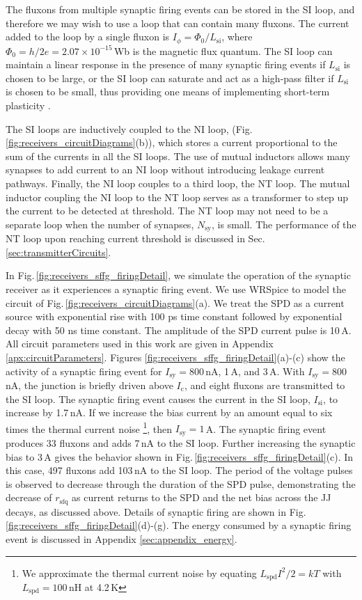 \documentclass[twocolumn]{article}
\begin{document}
The fluxons from multiple synaptic firing events can be stored in the SI loop, and therefore we may wish to use a loop that can contain many fluxons. The current added to the loop by a single fluxon is $I_{\phi} = \Phi_0/L_{\mathrm{si}}$, where $\Phi_{0} = h/2e = 2.07\times 10^{-15}$\,Wb is the magnetic flux quantum. The SI loop can maintain a linear response in the presence of many synaptic firing events if $L_{\mathrm{si}}$ is chosen to be large, or the SI loop can saturate and act as a high-pass filter if $L_{\mathrm{si}}$ is chosen to be small, thus providing one means of implementing short-term plasticity \cite{abre2004,sh2018c}.

The SI loops are inductively coupled to the NI loop, (Fig.\,\ref{fig:receivers_circuitDiagrams}(b)), which stores a current proportional to the sum of the currents in all the SI loops. The use of mutual inductors allows many synapses to add current to an NI loop without introducing leakage current pathways. Finally, the NI loop couples to a third loop, the NT loop. The mutual inductor coupling the NI loop to the NT loop serves as a transformer to step up the current to be detected at threshold. The NT loop may not need to be a separate loop when the number of synapses, $N_{\mathrm{sy}}$, is small. The performance of the NT loop upon reaching current threshold is discussed in Sec.\,\ref{sec:transmitterCircuits}.

In Fig.\,\ref{fig:receivers_sffg_firingDetail}, we simulate the operation of the synaptic receiver as it experiences a synaptic firing event. We use WRSpice \cite{wh1991} to model the circuit of Fig.\,\ref{fig:receivers_circuitDiagrams}(a). We treat the SPD as a current source with exponential rise with 100 ps time constant followed by exponential decay with 50 ns time constant. The amplitude of the SPD current pulse is 10\,\textmu A. All circuit parameters used in this work are given in Appendix \ref{apx:circuitParameters}. Figures \ref{fig:receivers_sffg_firingDetail}(a)-(c) show the activity of a synaptic firing event for $I_{\mathrm{sy}} = 800$\,nA, 1\,\textmu A, and 3\,\textmu A. With $I_{\mathrm{sy}} = 800$\,nA, the junction is briefly driven above $I_{\mathrm{c}}$, and eight fluxons are transmitted to the SI loop. The synaptic firing event causes the current in the SI loop, $I_{\mathrm{si}}$, to increase by 1.7\,nA. If we increase the bias current by an amount equal to six times the thermal current noise \footnote{We approximate the thermal current noise by equating $L_{\mathrm{spd}}I^2/2 = kT$ with $L_{\mathrm{spd}} = 100$\,nH at 4.2\,K}, then $I_{\mathrm{sy}} = 1$\,\textmu A. The synaptic firing event produces 33 fluxons and adds 7\,nA to the SI loop. Further increasing the synaptic bias to 3\,\textmu A gives the behavior shown in Fig.\,\ref{fig:receivers_sffg_firingDetail}(c). In this case, 497 fluxons add 103\,nA to the SI loop. The period of the voltage pulses is observed to decrease through the duration of the SPD pulse, demonstrating the decrease of $r_{\mathrm{sfq}}$ as current returns to the SPD and the net bias across the JJ decays, as discussed above. Details of synaptic firing are shown in Fig.\,\ref{fig:receivers_sffg_firingDetail}(d)-(g). The energy consumed by a synaptic firing event is discussed in Appendix \ref{sec:appendix_energy}.
\end{document}
